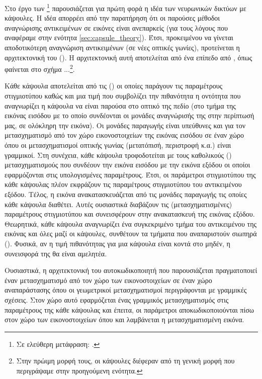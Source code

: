 Στο έργο των \footnote{Σε ελεύθερη μετάφραση: .} \cite{hinton2011transforming} παρουσιάζεται για πρώτη φορά η ιδέα των νευρωνικών δικτύων με κάψουλες. Η ιδέα απορρέει από την παρατήρηση ότι οι παρούσες μέθοδοι αναγνώρισης αντικειμένων σε εικόνες είναι ανεπαρκείς (για τους λόγους που αναφέραμε στην ενότητα \ref{sec:capsule_theory}). Έτσι, προκειμένου να γίνεται αποδοτικότερη αναγνώριση αντικειμένων (σε νέες οπτικές γωνίες), προτείνεται η αρχιτεκτονική του  (). Η αρχιτεκτονική αυτή αποτελείται από ένα επίπεδο από , όπως φαίνεται στο σχήμα ...\footnote{Στην πρώιμη μορφή τους, οι κάψουλες διέφεραν από τη γενική μορφή που περιγράψαμε στην προηγούμενη ενότητα.}.\par

Κάθε κάψουλα αποτελείται από τις  () οι οποίες παράγουν τις παραμέτρους στιγμιοτύπου καθώς και μια τιμή που συμβολίζει την πιθανότητα η οντότητα που αναγνωρίζει η κάψουλα να είναι παρούσα στο οπτικό της πεδίο (στο τμήμα της εικόνας εισόδου με το οποίο συνδέονται οι μονάδες αναγνώρισής της \textemdash στην περίπτωσή μας, σε ολόκληρη την εικόνα). Οι μονάδες παραγωγής είναι υπεύθυνες και για τον μετασχηματισμό από τον χώρο εικονοστοιχείων της εικόνας εισόδου σε έναν χώρο όπου οι μετασχηματισμοί οπτικής γωνίας (μετατόπισή, περιστροφή κ.α.) είναι γραμμικοί. Στη συνέχεια, κάθε κάψουλα τροφοδοτείται με τους καθολικούς () μετασχηματισμούς που συνδέουν την εικόνα εισόδου με την εικόνα εξόδου οι οποίοι εφαρμόζονται στις υπολογισμένες παραμέτρους. Έτσι, οι παράμετροι στιγμιοτύπου της κάθε κάψουλας πλέον εκφράζουν τις παραμέτρους στιγμιοτύπου του αντικειμένου εξόδου. Τέλος, η εικόνα ανακατασκευάζεται από τις μονάδες παραγωγής  τις οποίες κάθε κάψουλα διαθέτει. Αυτές ουσιαστικά διαβάζουν τις (μετασχηματισμένες) παραμέτρους στιγμιοτύπου και συνεισφέρουν στην ανακατασκευή της εικόνας εξόδου. Θεωρητικά, κάθε κάψουλα αναγνωρίζει ένα συγκεκριμένο τμήμα του αντικειμένου της εικόνας και όλες μαζί οι κάψουλες, συνθέτουν τα τμήματα που αναπαριστούν σιωπηρά (). Φυσικά, αν η τιμή πιθανότητας για μια κάψουλα είναι κοντά στο μηδέν, η συνεισφορά της θα είναι αμελητέα.\par

Ουσιαστικά, η αρχιτεκτονική του αυτο\textendash κωδικοποιητή που παρουσιάζεται πραγματοποιεί έναν μετασχηματισμό από τον χώρο των εικονοστοιχείων σε έναν χώρο αναπαράστασης όπου οι γεωμετρικοί μετασχηματισμοί περιγράφονται με γραμμικές σχέσεις. Στον χώρο αυτό εφαρμόζεται ένας γραμμικός μετασχηματισμός στις παραμέτρους της κάθε κάψουλας και έπειτα, οι παράμετροι αποκωδικοποιούνται πίσω στον χώρο των εικονοστοιχείων όπου και λαμβάνεται η μετασχηματισμένη εικόνα.\par

